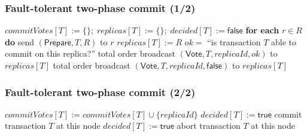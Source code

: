 
\begin{frame}
    \label{s:paxos-commit1}
    \frametitle{Fault-tolerant two-phase commit (1/2)}
    \footnotesize
    \begin{algorithmic}
            \State $\mathit{commitVotes}[T] := \{\};\; \mathit{replicas}[T] := \{\};\; \mathit{decided}[T] := \mathsf{false}$
        \EndOn
        \State
            \State \textbf{for each} $r \in R$ \textbf{do} send $(\mathsf{Prepare}, T, R)$ to $r$
        \EndOn
        \State
            \State $\mathit{replicas}[T] := R$
            \State $\mathit{ok} = $ ``is transaction $T$ able to commit on this replica?''
            \State total order broadcast $(\mathsf{Vote}, T, \mathit{replicaId}, \mathit{ok})$ to $\mathit{replicas}[T]$
        \EndOn
        \State
                \State total order broadcast $(\mathsf{Vote}, T, \mathit{replicaId}, \mathsf{false})$ to $\mathit{replicas}[T]$
            \EndFor
        \EndOn
    \end{algorithmic}
\end{frame}
\label{l:paxos-commit1}

\begin{frame}
    \label{s:paxos-commit2}
    \frametitle{Fault-tolerant two-phase commit (2/2)}
    \footnotesize
    \begin{algorithmic}
                    \State $\mathit{commitVotes}[T] := \mathit{commitVotes}[T] \cup \{\mathit{replicaId}\}$
                        \State $\mathit{decided}[T] := \mathsf{true}$
                        \State commit transaction $T$ at this node
                    \EndIf
                \Else
                    \State $\mathit{decided}[T] := \mathsf{true}$
                    \State abort transaction $T$ at this node
                \EndIf
            \EndIf
        \EndOn
    \end{algorithmic}
\end{frame}
\label{l:paxos-commit2}

